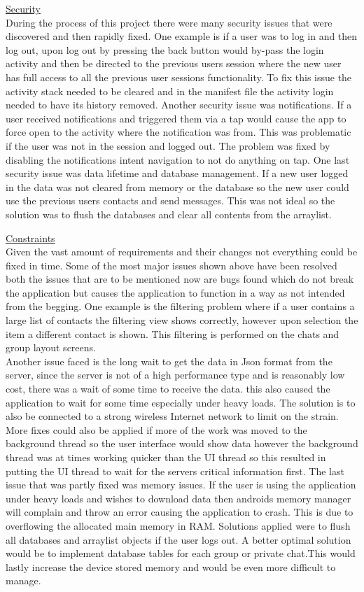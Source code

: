 \documentclass{article}
\begin{document}
\begin{enumerate}
	\underline{Security}\\
	During the process of this project there were many security issues that were discovered and then rapidly fixed. One example is if a user was to log in and then log out, upon log out by pressing the back button would by-pass the login activity and then be directed to the previous users session where the new user has full access to all the previous user sessions functionality. To fix this issue the activity stack needed to be cleared and in the manifest file the activity login needed to have its history removed. Another security issue was notifications. If a user received notifications and triggered them via a tap would cause the app to force open to the activity where the notification was from. This was problematic if the user was not in the session and logged out. The problem was fixed by disabling the notifications intent navigation to not do anything on tap. One last security issue was data lifetime and database management. If a new user logged in the data was not cleared from memory or the database so the new user could use the previous users contacts and send messages. This was not ideal so the solution was to flush the databases and clear all contents from the arraylist.\par
	
	\underline{Constraints}\\
	Given the vast amount of requirements and their changes not everything could be fixed in time. Some of the most major issues shown above have been resolved both the issues that are to be mentioned now are bugs found which do not break the application but causes the application to function in a way as not intended from the begging. One example is the filtering problem where if a user contains a large list of contacts the filtering view shows correctly, however upon selection the item a different contact is shown. This filtering is performed on the chats and group layout screens.\\
	Another issue faced is the long wait to get the data in Json format from the server, since the server is not of a high performance type and is reasonably low cost, there was a wait of some time to receive the data. this also caused the application to wait for some time especially under heavy loads. The solution is to also be connected to a strong wireless Internet network to limit on the strain. More fixes could also be applied if more of the work was moved to the background thread so the user interface would show data however the background thread was at times working quicker than the UI thread so this resulted in putting the UI thread to wait for the servers critical information first. The last issue that was partly fixed was memory issues. If the user is using the application under heavy loads and wishes to download data then androids memory manager will complain and throw an error causing the application to crash. This is due to overflowing the allocated main memory in RAM. Solutions applied were to flush all databases and arraylist objects if the user logs out. A better optimal solution would be to implement database tables for each group or private chat.This would lastly increase the device stored memory and would be even more difficult to manage.
	

\end{enumerate}
\end{document}
